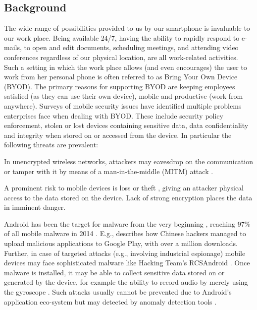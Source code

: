 \documentclass[11pt]{article}
\begin{document}
\subsection{Background}
The wide range of possibilities provided to us by our smartphone is invaluable to our work place. Being available 24/7, 
having the ability to rapidly respond to e-mails, to open and edit documents, scheduling meetings, and attending 
video conferences regardless of our physical location, are all work-related activities. Such a setting in which the work place allows (and even encourages) 
the user to work from her personal phone is often referred to as Bring Your Own Device (BYOD). The primary reasons for supporting BYOD 
\cite{ByodAndMobileSecurity, BYODBenefitsRisksAndControlTechniques} are keeping employees satisfied (as they can use their own device), 
mobile and productive (work from anywhere). Surveys of mobile security issues 
\cite{AMultitudeOfMobileSecurityIssues, EvaluationOfSecuritySolutionsForAndroidSystems, BYODBenefitsRisksAndControlTechniques, ByodAndMobileSecurity, BYODSecurityTechnologies} 
have identified multiple problems enterprises face when dealing with BYOD. 
These include security policy enforcement, stolen or lost devices containing sensitive data, data confidentiality and 
integrity when stored on or accessed from the device. In particular the following threats are prevalent: 
\begin{description}[itemsep=-2pt,topsep=5pt,leftmargin=1em]
  \item[Untrusted Networks] 
  	In unencrypted wireless networks, attackers may eavesdrop on the communication or tamper with 
  	it by means of a man-in-the-middle (MITM) attack \cite{MobileSecurityPredictions}.
  \item[Loss or Theft] 
  	A prominent risk to mobile devices is loss or theft \cite{PhoneLossArticle1, PhoneTheftArticle1, PhoneTheftArticle2, PhoneTheftArticle3}, 
  	giving an attacker physical access to the data stored on the device. Lack of strong encryption places the data in imminent danger. 
  \item[Malware] 
  	Android has been the target for malware from the very beginning \cite{AndroidMalware1}, reaching 97\% of all mobile malware in 2014 
  	\cite{AndroidMalware2, MobileThreatReport2015}. E.g., \cite{ChineseCybercriminalsBreachedGooglePlay} describes how Chinese hackers 
  	managed to upload malicious applications to Google Play, with over a million downloads.
  	Further, in case of targeted attacks (e.g., involving industrial espionage) mobile devices may face sophisticated malware like Hacking Team's 
  	RCSAndroid \cite{HackingTeamRCSAndroid}.
  	Once malware is installed, it may be able to collect sensitive data stored on or generated by the device, 
  	for example the ability to record audio by merely using the gyroscope \cite{Gyrophone}. Such attacks usually cannot be prevented due to 
  	Android's application eco-system but may detected by anomaly detection tools \cite{AndroidKBTA, Andromaly, AppIntent}.
\end{description}
\end{document}
